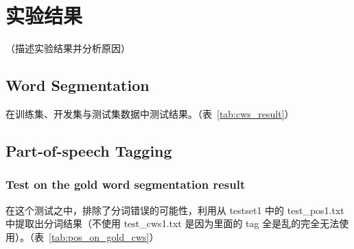 \section{实验结果}
\label{sec:result}

（描述实验结果并分析原因）

\subsection*{Word Segmentation}

在训练集、开发集与测试集数据中测试结果。（表~\ref{tab:cws_result}）



\subsection*{Part-of-speech Tagging}

\subsubsection*{Test on the gold word segmentation result}

在这个测试之中，排除了分词错误的可能性，利用从 testset1 中的 test\_pos1.txt 中提取出分词结果（不使用 test\_cws1.txt 是因为里面的 tag 全是乱的完全无法使用）。（表~\ref{tab:pos_on_gold_cws}）





% 
